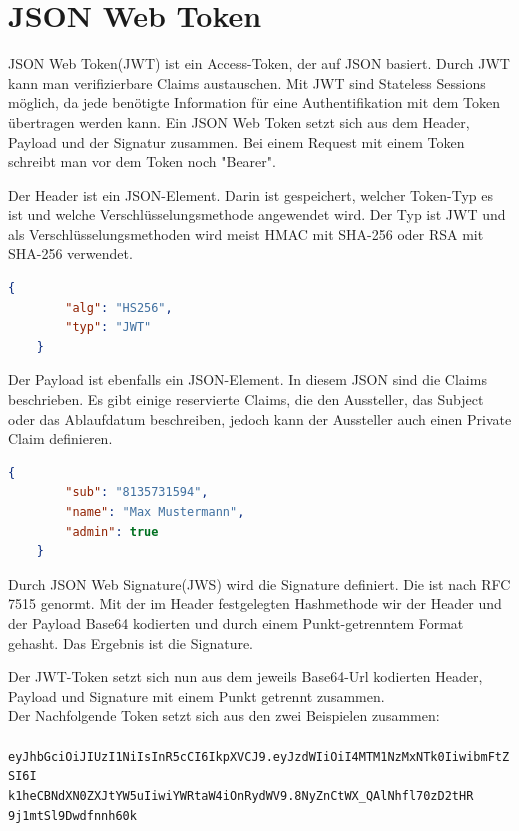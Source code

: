 \section{JSON Web Token}
JSON Web Token(JWT) ist ein Access-Token, der auf JSON basiert. Durch JWT kann man verifizierbare Claims austauschen. Mit JWT sind Stateless Sessions möglich, da jede benötigte Information für eine Authentifikation mit dem Token übertragen werden kann. Ein JSON Web Token setzt sich aus dem Header, Payload und der Signatur zusammen. Bei einem Request mit einem Token schreibt man vor dem Token noch "Bearer". \autocite{wikiJWT}

Der Header ist ein JSON-Element. Darin ist gespeichert, welcher Token-Typ es ist und welche Verschlüsselungsmethode angewendet wird. Der Typ ist JWT und als Verschlüsselungsmethoden wird meist HMAC mit SHA-256 oder RSA mit SHA-256 verwendet. \autocite{wikiJWT} \\
\begin{lstlisting}[caption={JWT-Header Beispiel}, language=json]
	{
		"alg": "HS256",
		"typ": "JWT"
	}
\end{lstlisting}

Der Payload ist ebenfalls ein JSON-Element. In diesem JSON sind die Claims beschrieben. Es gibt einige reservierte Claims, die den Aussteller, das Subject oder das Ablaufdatum beschreiben, jedoch kann der Aussteller auch einen Private Claim definieren. \autocite{wikiJWT} \\
\begin{lstlisting}[caption={JWT-Payload Beispiel}, language=json]
	{
		"sub": "8135731594",
		"name": "Max Mustermann",
		"admin": true
	}
\end{lstlisting}

Durch JSON Web Signature(JWS) wird die Signature definiert. Die ist nach RFC 7515 genormt. Mit der im Header festgelegten Hashmethode wir der Header und der Payload Base64 kodierten und durch einem Punkt-getrenntem Format gehasht. Das Ergebnis ist die Signature. \autocite{wikiJWT}

Der JWT-Token setzt sich nun aus dem jeweils Base64-Url kodierten Header, Payload und Signature mit einem Punkt getrennt zusammen. \autocite{wikiJWT} \\
Der Nachfolgende Token setzt sich aus den zwei Beispielen zusammen:\\
\texttt{
	eyJhbGciOiJIUzI1NiIsInR5cCI6IkpXVCJ9.eyJzdWIiOiI4MTM1NzMxNTk0IiwibmFtZSI6I\\k1heCBNdXN0ZXJtYW5uIiwiYWRtaW4iOnRydWV9.8NyZnCtWX\_QAlNhfl70zD2tHR\\9j1mtSl9Dwdfnnh60k
}

